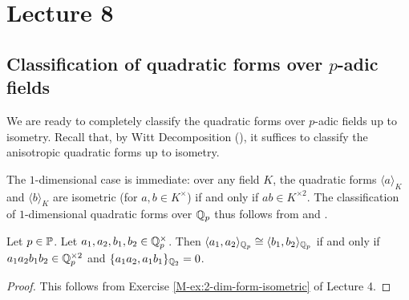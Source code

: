 \documentclass[12pt, leqno, british]{amsart}
\author{Nicolas Daans}
\begin{document}
\section{Lecture 8}

\subsection{Classification of quadratic forms over $p$-adic fields}
We are ready to completely classify the quadratic forms over $p$-adic fields up to isometry.
Recall that, by Witt Decomposition (), it suffices to classify the anisotropic quadratic forms up to isometry.

The $1$-dimensional case is immediate: over any field $K$, the quadratic forms $\langle a \rangle_K$ and $\langle b \rangle_K$ are isometric (for $a, b \in K^\times$) if and only if $ab \in K^{\times 2}$.
The classification of $1$-dimensional quadratic forms over $\mathbb Q_p$ thus follows from  and .

\begin{prop}\label{P:classify-2-dimensional-qqp}
Let $p \in \mathbb P$.
Let $a_1, a_2, b_1, b_2 \in \mathbb Q_p^\times$.
Then $\langle a_1, a_2 \rangle_{\mathbb Q_p} \cong \langle b_1, b_2 \rangle_{\mathbb Q_p}$ if and only if $a_1a_2b_1b_2 \in \mathbb Q_p^{\times 2}$ and $\lbrace a_1a_2, a_1b_1 \rbrace_{\mathbb Q_2} = 0$.
\end{prop}
\begin{proof}
This follows from Exercise \eqref{M-ex:2-dim-form-isometric} of Lecture 4.
\end{proof}
\end{document}
